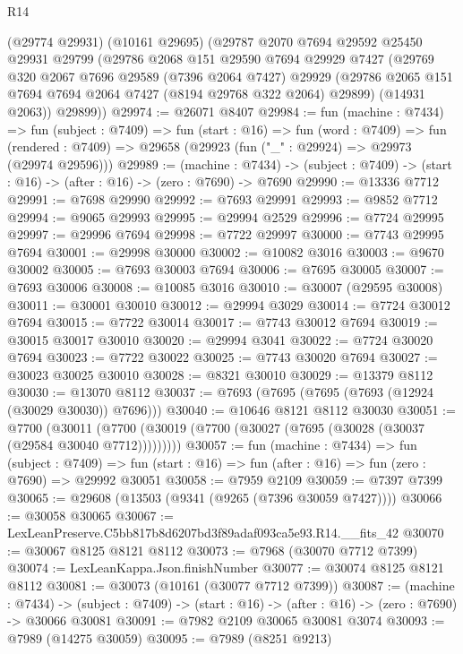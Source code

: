 \begin{lexlean}{R14}
\begin{coremodule}
    (@29774 @29931)
    (@10161 @29695)
    (@29787
      @2070
      @7694
      @29592
      @25450
      @29931
      @29799
      (@29786
        @2068
        @151
        @29590
        @7694
        @29929
        @7427
        (@29769
          @320
          @2067
          @7696
          @29589
          (@7396 @2064 @7427)
          @29929
          (@29786 @2065 @151 @7694 @7694 @2064 @7427 (@8194 @29768 @322 @2064) @29899)
          (@14931 @2063))
        @29899))
@29974 := @26071 @8407
@29984 := fun (machine : @7434) =>
  fun (subject : @7409) =>
  fun (start : @16) =>
  fun (word : @7409) =>
  fun (rendered : @7409) => @29658 (@29923 (fun ("_" : @29924) => @29973 (@29974 @29596)))
@29989 := (machine : @7434) ->
  (subject : @7409) -> (start : @16) -> (after : @16) -> (zero : @7690) -> @7690
@29990 := @13336 @7712
@29991 := @7698 @29990
@29992 := @7693 @29991
@29993 := @9852 @7712
@29994 := @9065 @29993
@29995 := @29994 @2529
@29996 := @7724 @29995
@29997 := @29996 @7694
@29998 := @7722 @29997
@30000 := @7743 @29995 @7694
@30001 := @29998 @30000
@30002 := @10082 @3016
@30003 := @9670 @30002
@30005 := @7693 @30003 @7694
@30006 := @7695 @30005
@30007 := @7693 @30006
@30008 := @10085 @3016
@30010 := @30007 (@29595 @30008)
@30011 := @30001 @30010
@30012 := @29994 @3029
@30014 := @7724 @30012 @7694
@30015 := @7722 @30014
@30017 := @7743 @30012 @7694
@30019 := @30015 @30017 @30010
@30020 := @29994 @3041
@30022 := @7724 @30020 @7694
@30023 := @7722 @30022
@30025 := @7743 @30020 @7694
@30027 := @30023 @30025 @30010
@30028 := @8321 @30010
@30029 := @13379 @8112
@30030 := @13070 @8112
@30037 := @7693 (@7695 (@7695 (@7693 (@12924 (@30029 @30030)) @7696)))
@30040 := @10646 @8121 @8112 @30030
@30051 := @7700
    (@30011 (@7700 (@30019 (@7700 (@30027 (@7695 (@30028 (@30037 (@29584 @30040 @7712)))))))))
@30057 := fun (machine : @7434) =>
  fun (subject : @7409) =>
  fun (start : @16) => fun (after : @16) => fun (zero : @7690) => @29992 @30051
@30058 := @7959 @2109
@30059 := @7397 @7399
@30065 := @29608 (@13503 (@9341 (@9265 (@7396 @30059 @7427))))
@30066 := @30058 @30065
@30067 := LexLeanPreserve.C5bb817b8d6207bd3f89adaf093ca5e93.R14.__fits_42
@30070 := @30067 @8125 @8121 @8112
@30073 := @7968 (@30070 @7712 @7399)
@30074 := LexLeanKappa.Json.finishNumber
@30077 := @30074 @8125 @8121 @8112
@30081 := @30073 (@10161 (@30077 @7712 @7399))
@30087 := (machine : @7434) ->
  (subject : @7409) -> (start : @16) -> (after : @16) -> (zero : @7690) -> @30066 @30081
@30091 := @7982 @2109 @30065 @30081 @3074
@30093 := @7989 (@14275 @30059)
@30095 := @7989 (@8251 @9213)

\end{coremodule}
\end{lexlean}
